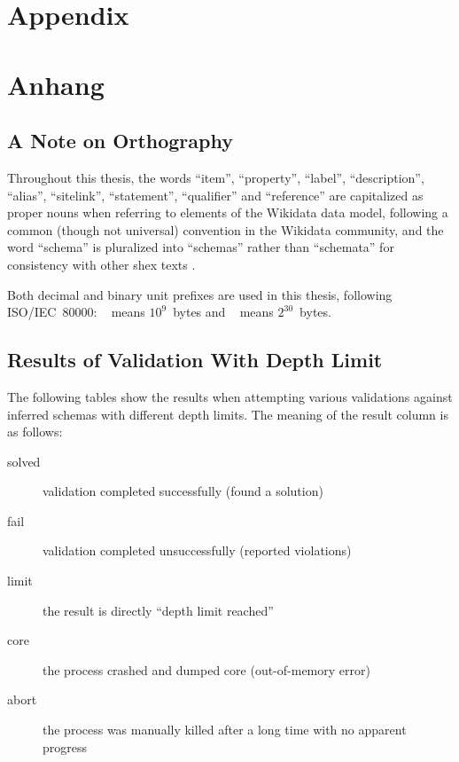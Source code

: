 
{\chapter{Appendix}}    %
{\chapter{Anhang}}      %
\label{chap:appendix}

\section{A Note on Orthography}

Throughout this thesis,
the words “\gls{item}”, “\gls{property}”,
“\gls{label}”, “\gls{description}”, “\gls{alias}”,
“\gls{sitelink}”,
“\gls{statement}”, “\gls{qualifier}” and “\gls{reference}”
are capitalized as proper nouns when referring to elements of the \gls{Wikidata} data model,
following a common (though not universal) convention in the \gls{Wikidata} community,
and the word “\gls{schema}” is pluralized into “\glspl{schema}”
rather than “schemata”
for consistency with other \gls{shex} texts \cite{shex,shex-primer}.

Both decimal and binary unit prefixes are used in this thesis, following ISO/IEC~80000:
\si{\giga\byte} means $10^9$~bytes and \si{\gibi\byte} means $2^{30}$~bytes.

\section{Results of Validation With Depth Limit}
\label{sec:appendix:depth-limit}

The following tables show the results
when attempting various validations against inferred \glspl{schema}
with different depth limits.
The meaning of the result column is as follows:

\begin{description}
\item[solved] validation completed successfully (found a solution)
\item[fail] validation completed unsuccessfully (reported violations)
\item[limit] the result is directly “depth limit reached”
\item[core] the process crashed and dumped core (out-of-memory error)
\item[abort] the process was manually killed after a long time with no apparent progress
\end{description}

